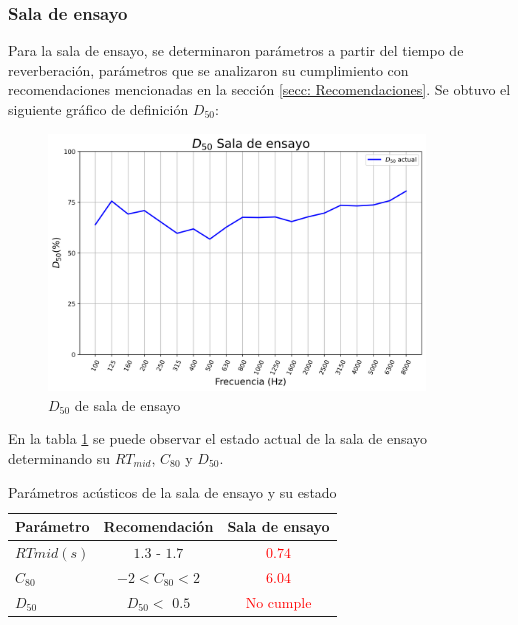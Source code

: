 \subsubsection{Sala de ensayo}
    Para la sala de ensayo, se determinaron parámetros a partir del tiempo de reverberación, parámetros que se analizaron su cumplimiento con recomendaciones mencionadas en la sección \ref{secc: Recomendaciones}.
    Se obtuvo el siguiente gráfico de definición $D_{50}$:
    \begin{figure}[H]
        \centering
        \includegraphics[width=10cm]{Imagenes/Resultados/D50_actual.png}
        \caption{$D_{50}$ de sala de ensayo}
    \end{figure}
    En la tabla \ref{tab:parametros acusticos sala ensayo} se puede observar el estado actual de la sala de ensayo determinando su $RT_{mid}$, $C_{80}$ y $D_{50}$.
    \begin{table}[H]
        \centering
        \begin{tabular}{|l|c|c|}
        \hline
        \textbf{Parámetro}& \textbf{Recomendación} & \textbf{Sala de ensayo}\\ \hline
        $RT{mid} (s)$ &  $1.3$ - $1.7$  & \textcolor{red}{$0.74$} \\ \hline
        $C_{80}$      & $-2<C_{80}<2$   & \textcolor{red}{$6.04$} \\\hline
        $D_{50}$      & $D_{50}<$ $0.5$   & \textcolor{red}{No cumple} \\\hline
        \end{tabular}
        \caption{Parámetros acústicos de la sala de ensayo y su estado}
        \label{tab:parametros acusticos sala ensayo}
    \end{table}
